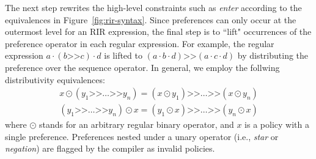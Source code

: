 \documentclass[10pt]{sigalternate052015}
\newcommand{\Prefer}{\texttt{>>}}
\renewcommand{\path}[2]{ #1 \mapsto \ensuremath{#2} }
\begin{document}
The next step rewrites the high-level constraints such as \textit{enter} according to the equivalences in Figure~\ref{fig:rir-syntax}. Since preferences can only occur at the outermost level for an RIR expression, the final step is to ``lift" occurrences of the preference operator in each regular expression. For example, the regular expression $a \cdot (b \Prefer c) \cdot d$ is lifted to $(a \cdot b \cdot d) \Prefer (a \cdot c \cdot d)$ by distributing the preference over the sequence operator. In general, we employ the follwing distributivity equivalences:
%
\[ 
\begin{array}{c}
  x \odot (y_1 \Prefer \dots \Prefer y_n) = (x \odot y_1) \Prefer \dots \Prefer (x \odot y_n) \\
  (y_1 \Prefer \dots \Prefer y_n) \odot x = (y_1 \odot x) \Prefer \dots \Prefer (y_n \odot x)
\end{array}
\]
%
where $\odot$ stands for an arbitrary regular binary operator, and $x$ is a policy with a single preference. Preferences nested under a unary operator (i.e., \textit{star} or \textit{negation}) are flagged by the compiler as invalid policies.





\newcommand{\state}[4]{\node[state,#3](#1)[#4]{#2};}
\newcommand{\transition}[4]{\path[->] (#1) edge [#4] node {#3} (#2);}
\end{document}
